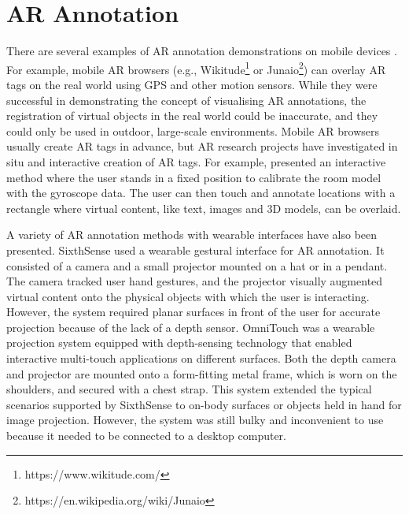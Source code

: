 
\section{AR Annotation}

There are several examples of AR annotation demonstrations on mobile devices \cite{Wither2009a, Gauglitz2014, Larabi2018, Grasset2012}. For example, mobile AR browsers (e.g., Wikitude\footnote{https://www.wikitude.com/} or Junaio\footnote{https://en.wikipedia.org/wiki/Junaio}) can overlay AR tags on the real world using GPS and other motion sensors. While they were successful in demonstrating the concept of visualising AR annotations, the registration of virtual objects in the real world could be inaccurate, and they could only be used in outdoor, large-scale environments. Mobile AR browsers usually create AR tags in advance, but  AR research projects have investigated in situ and interactive creation of AR tags. For example, \textcite{Kim2011} presented an interactive method where the user stands in a fixed position to calibrate the room model with the gyroscope data. The user can then touch and annotate locations with a rectangle where virtual content, like text, images and 3D models, can be overlaid. 

A variety of AR annotation methods with wearable interfaces have also been presented. SixthSense \cite{Mistry2009a} used a wearable gestural interface for AR annotation. It consisted of a camera and a small projector mounted on a hat or in a pendant. The camera tracked user hand gestures, and the projector visually augmented virtual content onto the physical objects with which the user is interacting. However, the system required planar surfaces in front of the user for accurate projection because of the lack of a depth sensor. OmniTouch \cite{Hollerer1999a} was a wearable projection system equipped with depth-sensing technology that enabled interactive multi-touch applications on different surfaces. Both the depth camera and projector are mounted onto a form-fitting metal frame, which is worn on the shoulders, and secured with a chest strap. This system extended the typical scenarios supported by SixthSense to on-body surfaces or objects held in hand for image projection. However, the system was still bulky and inconvenient to use because it needed to be connected to a desktop computer.

